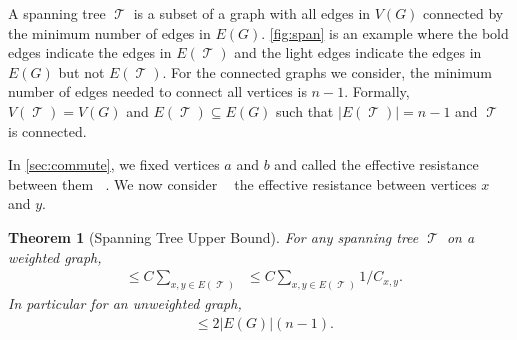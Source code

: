 \documentclass[12pt]{article}
\newtheorem{theorem}{Theorem}
\theoremstyle{definition}
\DeclareMathOperator{\tcov}{t_\textrm{cov}}      %
\DeclareMathOperator{\Reff}{R_{\textrm{eff}}}    %
\DeclareMathOperator{\Rxy}{R_{\textrm{x,y}}}     %
\DeclareMathOperator{\T}{\mathcal{T}}            %
\begin{document}
A spanning tree $\T$ is a subset of a graph with all edges
in $V(G)$ connected by the minimum number of edges in $E(G)$.
\cref{fig:span} is an example where the bold edges indicate the edges in $E(\T)$
and the light edges indicate the edges in $E(G)$ but not $E(\T)$.
For the connected graphs we consider, the minimum number of edges
needed to connect all vertices is $n-1$.
Formally, $V(\T) = V(G)$ and $E(\T) \subseteq E(G)$
such that $|E(\T)| = n-1$ and $\T$ is connected.


In \cref{sec:commute}, we fixed vertices $a$ and $b$ and called
the effective resistance between them $\Reff$.
We now consider $\Rxy$ the effective resistance between vertices $x$ and $y$.

\begin{theorem}[Spanning Tree Upper Bound] \label{thm:span}
For any spanning tree $\T$ on a weighted graph,
\begin{align}
\tcov \leq C \sum_{x,y \in E(\T)} \Rxy \leq C \sum_{x,y \in E(\T)} 1 / C_{x,y}. \nonumber
\end{align}
In particular for an unweighted graph,
\begin{align}
\tcov \leq 2 |E(G)| (n-1). \nonumber 
\end{align}
\end{theorem}
\end{document}
